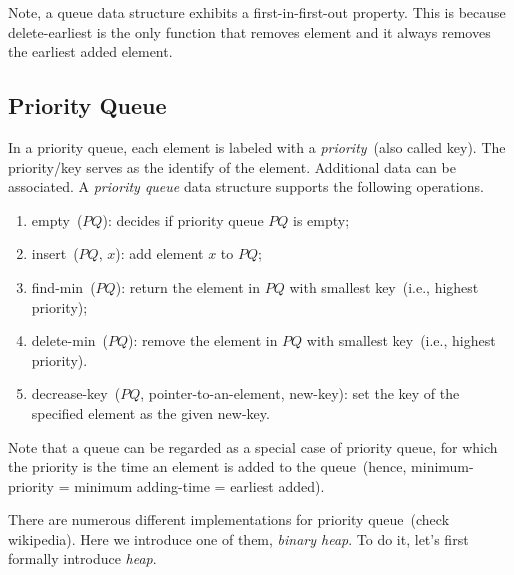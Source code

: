 \begin{minipage}{0.8\textwidth}
	\xxx
	\xxx
	\xxx
\end{minipage}

\begin{minipage}{0.8\textwidth}
	\xxx
	\xxx
	\xxx
	\xxx
\end{minipage}

Note, a queue data structure exhibits a first-in-first-out property.
This is because delete-earliest is the only function that removes element and
it always removes the earliest added element. %

\subsection*{Priority Queue}

In a priority queue, each element is labeled with a \emph{priority}~(also called key).
The priority/key serves as the identify of the element.
Additional data can be associated.
A \emph{priority queue} data structure supports the following operations.
\vspace*{-\topsep}
\begin{enumerate}
\item empty~($PQ$): decides if priority queue $PQ$ is empty;
\item insert~($PQ$, $x$): add element $x$ to $PQ$;
\item find-min~($PQ$): return the element in $PQ$ with smallest key~(i.e., highest priority);
\item delete-min~($PQ$): remove the element in $PQ$ with smallest key~(i.e., highest priority).
\item decrease-key~($PQ$, pointer-to-an-element, new-key): set the key of the specified element as the given new-key.
\end{enumerate}

Note that a queue can be regarded as a special case of priority queue, for which the priority
is the time an element is added to the queue~(hence, minimum-priority = minimum adding-time = earliest added).

There are numerous different implementations for priority queue~(check wikipedia). 
Here we introduce one of them, \emph{binary heap}. To do it, let's first
formally introduce \emph{heap}.

